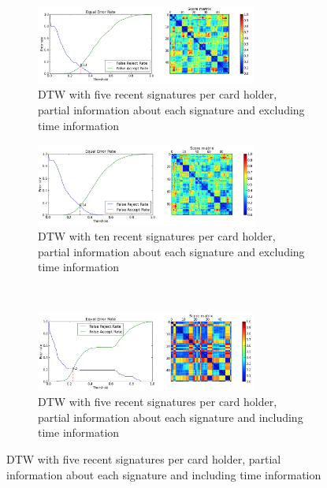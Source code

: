 \documentclass[a4paper, oneside]{csthesis}
\begin{document}
\begin{figure}
        \centering
        \begin{subfigure}[b]{\textwidth}
                \centering
                \includegraphics[width=0.8\textwidth]{figures/dtw-exp1.png}
                \caption{DTW with five recent signatures per card holder, partial information about each signature and excluding time information}
                \label{fig:dtw-exp1}
        \end{subfigure}%

        \begin{subfigure}[b]{\textwidth}
                \centering
                \includegraphics[width=0.8\textwidth]{figures/dtw-exp2.png}
                \caption{DTW with ten recent signatures per card holder, partial information about each signature and excluding time information}
                \label{fig:dtw-exp2}
        \end{subfigure}%

        ~ %
        \begin{subfigure}[b]{\textwidth}
                \centering
                \includegraphics[width=0.8\textwidth]{figures/dtw-exp3.png}
                \caption{DTW with five recent signatures per card holder, partial information about each signature and including time information}
                \label{fig:dtw-exp3}
        \end{subfigure}%


\end{figure}
\end{document}

